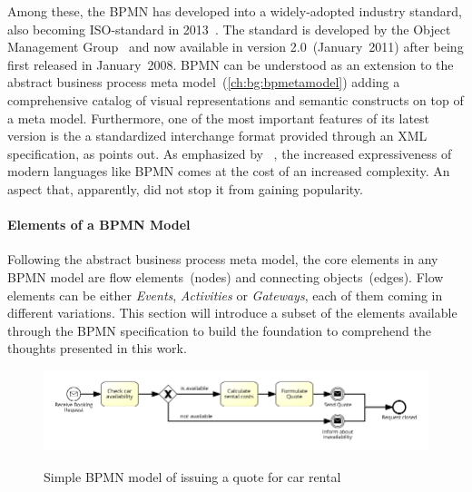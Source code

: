 Among these, the \acs{BPMN} has developed into a widely-adopted industry standard, also becoming ISO-standard in 2013~\cite{iso2013bpmn}.
The standard is developed by the Object Management Group~\cite{omghome} and now available in version 2.0~(January~2011) after being first released in January~2008.
\acs{BPMN} can be understood as an extension to the abstract business process meta model~(\autoref{ch:bg:bpmetamodel}) adding a comprehensive catalog of visual representations and semantic constructs on top of a meta model. Furthermore, one of the most important features of its latest version is the a standardized interchange format provided through an \acs{XML} specification, as \cite{weske:bpm-book} points out.
As emphasized by \citeauthor{Muehlen:2007}~\cite{Muehlen:2007}, the increased expressiveness of modern languages like \acs{BPMN} comes at the cost of an increased complexity. An aspect that, apparently, did not stop it from gaining popularity.

\paragraph{Elements of a BPMN Model}
Following the abstract business process meta model, the core elements in any BPMN model are flow elements~(nodes) and connecting objects~(edges).
Flow elements can be either \textit{Events}, \textit{Activities} or \textit{Gateways}, each of them coming in different variations.
This section will introduce a subset of the elements available through the \acs{BPMN} specification to build the foundation to comprehend the thoughts presented in this work.

\begin{figure}[]
	\myfloatalign
	{\includegraphics[width=1\linewidth]{chapters/background/intro-rental-car.png}}
	\caption{Simple BPMN model of issuing a quote for car rental}
	\label{fig:simple-bpmn-model}
\end{figure}

